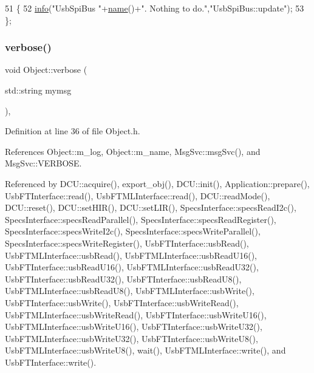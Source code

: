 \begin{DoxyCode}
51                  \{
52     \hyperlink{classObject_a644fd329ea4cb85f54fa6846484b84a8}{info}(\textcolor{stringliteral}{"UsbSpiBus "}+\hyperlink{classObject_a300f4c05dd468c7bb8b3c968868443c1}{name}()+\textcolor{stringliteral}{". Nothing to do."},\textcolor{stringliteral}{"UsbSpiBus::update"});
53   \};
\end{DoxyCode}
\mbox{\label{classObject_a83d2db2df682907ea1115ad721c1c4a1}} 
\subsubsection{\texorpdfstring{verbose()}{verbose()}\hspace{0.1cm}{\footnotesize\ttfamily [1/2]}}
{\footnotesize\ttfamily void Object\+::verbose (\begin{DoxyParamCaption}\item[{std\+::string}]{mymsg }\end{DoxyParamCaption})\hspace{0.3cm}{\ttfamily [inline]}, {\ttfamily [inherited]}}



Definition at line 36 of file Object.\+h.



References Object\+::m\+\_\+log, Object\+::m\+\_\+name, Msg\+Svc\+::msg\+Svc(), and Msg\+Svc\+::\+V\+E\+R\+B\+O\+SE.



Referenced by D\+C\+U\+::acquire(), export\+\_\+obj(), D\+C\+U\+::init(), Application\+::prepare(), Usb\+F\+T\+Interface\+::read(), Usb\+F\+T\+M\+L\+Interface\+::read(), D\+C\+U\+::read\+Mode(), D\+C\+U\+::reset(), D\+C\+U\+::set\+H\+I\+R(), D\+C\+U\+::set\+L\+I\+R(), Specs\+Interface\+::specs\+Read\+I2c(), Specs\+Interface\+::specs\+Read\+Parallel(), Specs\+Interface\+::specs\+Read\+Register(), Specs\+Interface\+::specs\+Write\+I2c(), Specs\+Interface\+::specs\+Write\+Parallel(), Specs\+Interface\+::specs\+Write\+Register(), Usb\+F\+T\+Interface\+::usb\+Read(), Usb\+F\+T\+M\+L\+Interface\+::usb\+Read(), Usb\+F\+T\+M\+L\+Interface\+::usb\+Read\+U16(), Usb\+F\+T\+Interface\+::usb\+Read\+U16(), Usb\+F\+T\+M\+L\+Interface\+::usb\+Read\+U32(), Usb\+F\+T\+Interface\+::usb\+Read\+U32(), Usb\+F\+T\+Interface\+::usb\+Read\+U8(), Usb\+F\+T\+M\+L\+Interface\+::usb\+Read\+U8(), Usb\+F\+T\+M\+L\+Interface\+::usb\+Write(), Usb\+F\+T\+Interface\+::usb\+Write(), Usb\+F\+T\+Interface\+::usb\+Write\+Read(), Usb\+F\+T\+M\+L\+Interface\+::usb\+Write\+Read(), Usb\+F\+T\+Interface\+::usb\+Write\+U16(), Usb\+F\+T\+M\+L\+Interface\+::usb\+Write\+U16(), Usb\+F\+T\+Interface\+::usb\+Write\+U32(), Usb\+F\+T\+M\+L\+Interface\+::usb\+Write\+U32(), Usb\+F\+T\+Interface\+::usb\+Write\+U8(), Usb\+F\+T\+M\+L\+Interface\+::usb\+Write\+U8(), wait(), Usb\+F\+T\+M\+L\+Interface\+::write(), and Usb\+F\+T\+Interface\+::write().


